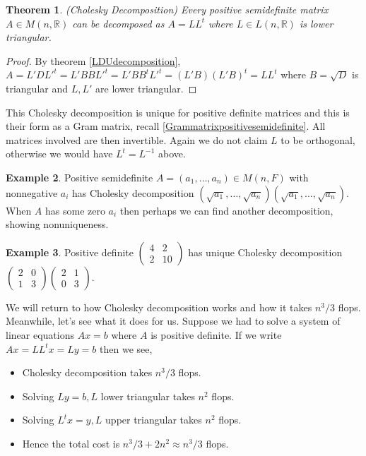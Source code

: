 \documentclass[12pt]{amsart}
\newtheorem{theorem}{Theorem}[section]
\theoremstyle{definition}
\newtheorem{example}[theorem]{Example}
\begin{document}
\begin{theorem}\label{} (Cholesky Decomposition) Every positive semidefinite matrix $A \in M(n, \mathbb{R})$ can be decomposed as $A = LL^t$ where $L \in L(n, \mathbb{R})$ is lower triangular.
\end{theorem}
\begin{proof} By theorem \ref{LDUdecomposition}, $A = L'DL'^t = L'BBL'^t = L'BB^tL'^t = (L'B)(L'B)^t = LL^t$ where $B = \sqrt{D}$ is triangular and $L,L'$ are lower triangular.
\end{proof}

This Cholesky decomposition is unique for positive definite matrices and this is their form as a Gram matrix, recall \ref{Grammatrixpositivesemidefinite}. All matrices involved are then invertible. Again we do not claim $L$ to be orthogonal, otherwise we would have $L^t = L^{-1}$ above.

\begin{example} Positive semidefinite $A = (a_1, \dots , a_n) \in M(n, F)$ with nonnegative $a_i$ has Cholesky decomposition $(\sqrt{a_1}, \dots, \sqrt{a_n})(\sqrt{a_1}, \dots, \sqrt{a_n})$. When $A$ has some zero $a_i$ then perhaps we can find another decomposition, showing nonuniqueness. 
\end{example}

\begin{example}\label{} Positive definite $\left(\begin{array}{cc} 4 & 2 \\ 2 & 10 \end{array}\right)$ has unique Cholesky decomposition $\left(\begin{array}{cc} 2 & 0 \\ 1 & 3 \end{array}\right)\left(\begin{array}{cc} 2 & 1 \\ 0 & 3 \end{array}\right)$.
\end{example}

We will return to how Cholesky decomposition works and how it takes $n^3/3$ flops. Meanwhile, let's see what it does for us. Suppose we had to solve a system of linear equations $Ax = b$ where $A$ is positive definite. If we write $Ax = LL^tx = Ly = b$ then we see,
\begin{itemize}
\item Cholesky decomposition takes $n^3/3$ flops.
\item Solving $Ly = b, L$ lower triangular takes $n^2$ flops.
\item Solving $L^tx = y, L$ upper triangular takes $n^2$ flops.
\item Hence the total cost is $n^3/3 + 2n^2 \approx n^3/3$ flops.
\end{itemize}
\end{document}
